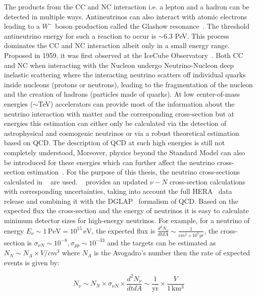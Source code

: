 The products from the CC and NC interaction i.e. a lepton and a hadron can be detected in multiple ways. 
Antineutrinos can also interact with atomic electrons leading to a $W^-$ boson production called the Glashow resonance~\cite{PhysRev.118.316}. The threshold antineutrino energy for such a reaction to occur is $\sim$6.3 PeV. This process dominates the CC and NC interaction albeit only in a small energy range. Proposed in 1959, it was first observed at the IceCube Observatory~\cite{IceCube:2021rpz}. Both CC and NC when interacting with the Nucleon undergo Neutrino-Nucleon deep inelastic scattering where the interacting neutrino scatters off individual quarks inside nucleons (protons or neutrons), leading to the fragmentation of the nucleon and the creation of hadrons (particles made of quarks). At low center-of-mass energies ($\sim$TeV) accelerators can provide most of the information about the neutrino interaction with matter and the corresponding cross-section but at energies this estimation can either only be calculated via the detection of astrophysical and cosmogenic neutrinos or via a robust theoretical estimation based on \gls{QCD}. The description of \gls*{QCD} at such high energies is still not completely understood, Moreover, physics beyond the Standard Model can also be introduced for these energies which can further affect the neutrino cross-section estimation~\cite{PhysRevD.107.033009}. For the purpose of this thesis, the neutrino cross-sections calculated in ~\cite{Cooper_Sarkar_2011} are used. ~\cite{Cooper_Sarkar_2011} provides an updated $\nu -N$ cross-section calculations with corresponding uncertainties, taking into account the full HERA~\cite{aaron2010combined} data release and combining it with the DGLAP~\cite{ALTARELLI1977298,Dokshitzer:1977sg,Gribov:427157} formalism of QCD. Based on the expected flux the cross-section and the energy of neutrinos it is easy to calculate minimum detector sizes for high-energy neutrinos. For example, for a neutrino of energy $E_{\nu} \sim 1\,\text{PeV} = 10^{15}\,\text{eV}$, the expected flux is $\frac{d^2N_{\nu}}{dt dA} \sim \frac{1}{cm^2 \times 10^5 yr}$, the cross-section is $\sigma_{\nu N} \sim 10^{-8} , \sigma_{pp} \sim 10^{-33}$ and the targets can be estimated as $ N_N \sim N_A \times V/cm^3$ where $N_A$ is the Avogadro's number then the rate of expected events is given by:

\begin{equation}
  N_{\nu} \sim N_N \times \sigma_{\nu N} \times \frac{d^2N_{\nu}}{dt dA} \sim \frac{1}{\text{yr}} \times \frac{V}{1\,\mathrm{km^3}}
\end{equation}

